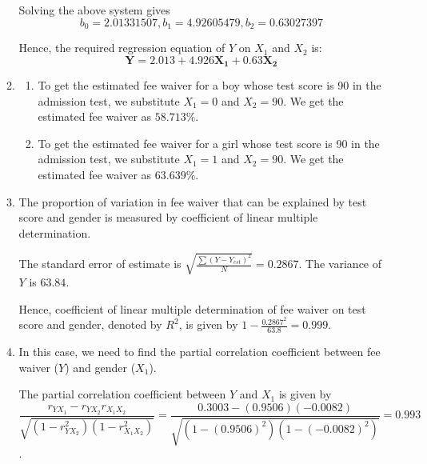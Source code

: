 \documentclass[12pt, oneside]{article}
\begin{document}
\begin{enumerate}
\begin{enumerate}
Solving the above system gives
\[ b_0 = 2.01331507, b_1 = 4.92605479, b_2 = 0.63027397 \]

Hence, the required regression equation of $Y$ on $X_1$ and $X_2$ is:
\[\mathbf{ Y = 2.013 + 4.926 X_1 + 0.63 X_2 }\]


\item
\begin{enumerate}
    \item To get the estimated fee waiver for a boy whose test score is 90 in the admission test, we substitute $X_1 = 0$ and $X_2 = 90$. We get the estimated fee waiver as $\mathbf{58.713\%}$.
    
    \item To get the estimated fee waiver for a girl whose test score is 90 in the admission test, we substitute $X_1 = 1$ and $X_2 = 90$. We get the estimated fee waiver as $\mathbf{63.639\%}$.
\end{enumerate}

\item
The proportion of variation in fee waiver that can be explained by test score and gender is measured by coefficient of linear multiple determination.

The standard error of estimate is $\sqrt{\frac{\sum (Y-Y_{est})^2}{N}} = 0.2867$.
The variance of $Y$ is $63.84$.

Hence, coefficient of linear multiple determination of fee waiver on test score and gender, denoted by $R^2$, is given by ${1-\frac{0.2867^2}{63.8}} = 0.999$.


\item 
In this case, we need to find the partial correlation coefficient between fee waiver ($Y$) and gender ($X_1$).

The partial correlation coefficient between $Y$ and $X_1$ is given by $\dfrac{r_{YX_1}-r_{YX_2}r_{X_1X_2} } { \sqrt{ (1-r_{YX_2}^2)(1-r_{X_1X_2}^2) } } = \dfrac{0.3003 -(0.9506)(-0.0082) }  { \sqrt{ (1-(0.9506)^2)(1-(-0.0082)^2) } } = 0.993$.



\end{enumerate}
\end{enumerate}
\end{document}
